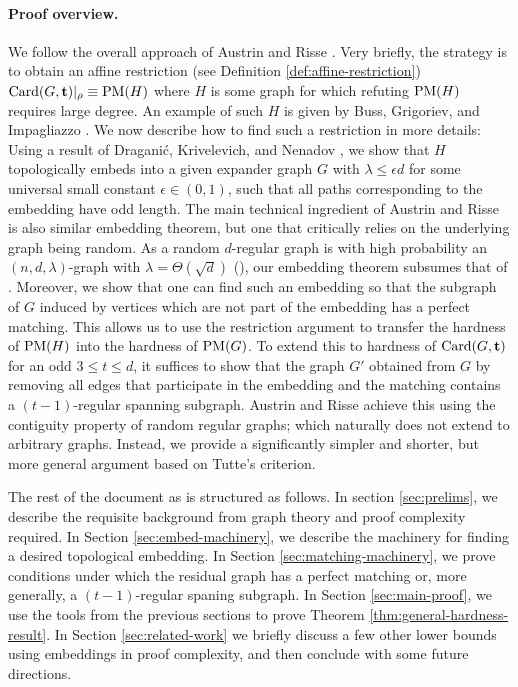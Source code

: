 \documentclass[11pt]{article}
\begin{document}
\paragraph{Proof overview.}
We follow the overall approach of Austrin and Risse \cite{Austrin_2022}. Very briefly, the strategy is to obtain an affine restriction (see Definition \ref{def:affine-restriction}) $\text{Card}(G, \mathbf{t})|_\rho \equiv \text{PM}(H)$ where $H$ is some graph for which refuting $\text{PM}(H)$ requires large degree.
An example of such $H$ is given by Buss, Grigoriev, and Impagliazzo \cite{buss1999linear}. We now describe how to find such a restriction in more details: Using a result of Dragani\'c, Krivelevich, and Nenadov \cite{draganic22rolling}, we show that $H$ topologically embeds into a given expander graph $G$ with $\lambda \le \epsilon d$ for some universal small constant $\epsilon \in (0,1)$, such that all paths corresponding to the embedding have odd length.
The main technical ingredient of Austrin and Risse is also similar embedding theorem, but one that critically relies on the underlying graph being random.
As a random $d$-regular graph is with high probability an $(n, d, \lambda)$-graph with $\lambda = \Theta(\sqrt{d})$ (\cite[see Theorem A]{tikhomirov2016spectralgapdenserandom}), our embedding theorem subsumes that of \cite{Austrin_2022}.
Moreover, we show that one can find such an embedding so that the subgraph of $G$ induced by vertices which are not part of the embedding has a perfect matching.
This allows us to use the restriction argument to transfer the hardness of $\text{PM}(H)$ into the hardness of $\text{PM}(G)$.
To extend this to hardness of $\text{Card}(G, \mathbf{t})$ for an odd $3 \le t \leq d$, it suffices to show that the graph $G'$ obtained from $G$ by removing all edges that participate in the embedding and the matching contains a $(t-1)$-regular spanning subgraph.
Austrin and Risse achieve this using the contiguity property of random regular graphs; which naturally does not extend to arbitrary graphs.
Instead, we provide a significantly simpler and shorter, but more general argument based on Tutte's criterion.\par
The rest of the document as is structured as follows. In section \ref{sec:prelims}, we describe the requisite background from graph theory and proof complexity required.
In Section \ref{sec:embed-machinery}, we describe the machinery for finding a desired topological embedding.
In Section \ref{sec:matching-machinery}, we prove conditions under which the residual graph has a perfect matching or, more generally, a $(t-1)$-regular spaning subgraph.
In Section \ref{sec:main-proof}, we use the tools from the previous sections to prove Theorem \ref{thm:general-hardness-result}. 
In Section \ref{sec:related-work} we briefly discuss a few other lower bounds using embeddings in proof complexity, and then conclude with some future directions.
\end{document}
